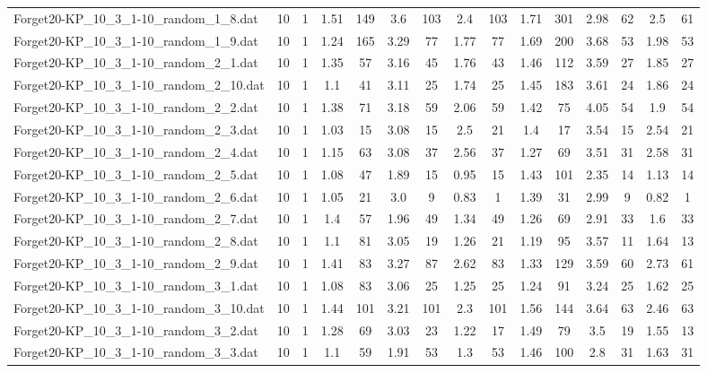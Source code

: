 \begin{table}[!ht]
{\begin{tabular}{lcccccccccccccc}
Forget20-KP\_10\_3\_1-10\_random\_1\_8.dat & 10 & 1 & 1.51 & 149 & 3.6 & 103 & 2.4 & 103 & 1.71 & 301 & 2.98 & 62 & 2.5 & 61 \\
Forget20-KP\_10\_3\_1-10\_random\_1\_9.dat & 10 & 1 & 1.24 & 165 & 3.29 & 77 & 1.77 & 77 & 1.69 & 200 & 3.68 & 53 & 1.98 & 53 \\
Forget20-KP\_10\_3\_1-10\_random\_2\_1.dat & 10 & 1 & 1.35 & 57 & 3.16 & 45 & 1.76 & 43 & 1.46 & 112 & 3.59 & 27 & 1.85 & 27 \\
Forget20-KP\_10\_3\_1-10\_random\_2\_10.dat & 10 & 1 & 1.1 & 41 & 3.11 & 25 & 1.74 & 25 & 1.45 & 183 & 3.61 & 24 & 1.86 & 24 \\
Forget20-KP\_10\_3\_1-10\_random\_2\_2.dat & 10 & 1 & 1.38 & 71 & 3.18 & 59 & 2.06 & 59 & 1.42 & 75 & 4.05 & 54 & 1.9 & 54 \\
Forget20-KP\_10\_3\_1-10\_random\_2\_3.dat & 10 & 1 & 1.03 & 15 & 3.08 & 15 & 2.5 & 21 & 1.4 & 17 & 3.54 & 15 & 2.54 & 21 \\
Forget20-KP\_10\_3\_1-10\_random\_2\_4.dat & 10 & 1 & 1.15 & 63 & 3.08 & 37 & 2.56 & 37 & 1.27 & 69 & 3.51 & 31 & 2.58 & 31 \\
Forget20-KP\_10\_3\_1-10\_random\_2\_5.dat & 10 & 1 & 1.08 & 47 & 1.89 & 15 & 0.95 & 15 & 1.43 & 101 & 2.35 & 14 & 1.13 & 14 \\
Forget20-KP\_10\_3\_1-10\_random\_2\_6.dat & 10 & 1 & 1.05 & 21 & 3.0 & 9 & 0.83 & 1 & 1.39 & 31 & 2.99 & 9 & 0.82 & 1 \\
Forget20-KP\_10\_3\_1-10\_random\_2\_7.dat & 10 & 1 & 1.4 & 57 & 1.96 & 49 & 1.34 & 49 & 1.26 & 69 & 2.91 & 33 & 1.6 & 33 \\
Forget20-KP\_10\_3\_1-10\_random\_2\_8.dat & 10 & 1 & 1.1 & 81 & 3.05 & 19 & 1.26 & 21 & 1.19 & 95 & 3.57 & 11 & 1.64 & 13 \\
Forget20-KP\_10\_3\_1-10\_random\_2\_9.dat & 10 & 1 & 1.41 & 83 & 3.27 & 87 & 2.62 & 83 & 1.33 & 129 & 3.59 & 60 & 2.73 & 61 \\
Forget20-KP\_10\_3\_1-10\_random\_3\_1.dat & 10 & 1 & 1.08 & 83 & 3.06 & 25 & 1.25 & 25 & 1.24 & 91 & 3.24 & 25 & 1.62 & 25 \\
Forget20-KP\_10\_3\_1-10\_random\_3\_10.dat & 10 & 1 & 1.44 & 101 & 3.21 & 101 & 2.3 & 101 & 1.56 & 144 & 3.64 & 63 & 2.46 & 63 \\
Forget20-KP\_10\_3\_1-10\_random\_3\_2.dat & 10 & 1 & 1.28 & 69 & 3.03 & 23 & 1.22 & 17 & 1.49 & 79 & 3.5 & 19 & 1.55 & 13 \\
Forget20-KP\_10\_3\_1-10\_random\_3\_3.dat & 10 & 1 & 1.1 & 59 & 1.91 & 53 & 1.3 & 53 & 1.46 & 100 & 2.8 & 31 & 1.63 & 31 \\

\end{tabular}}
\end{table}
